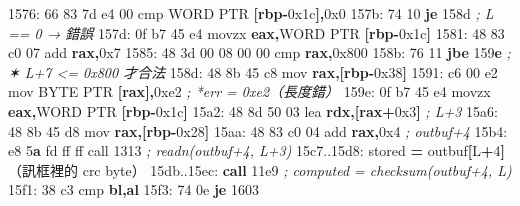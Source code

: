 \documentclass[10pt,a4paper]{article}
\newenvironment{Shaded}{\begin{snugshade}}{\end{snugshade}}
\newcommand{\BaseNTok}[1]{\textcolor[rgb]{0.00,0.00,0.81}{#1}}
\newcommand{\BuiltInTok}[1]{#1}
\newcommand{\CommentTok}[1]{\textcolor[rgb]{0.56,0.35,0.01}{\textit{#1}}}
\newcommand{\ControlFlowTok}[1]{\textcolor[rgb]{0.13,0.29,0.53}{\textbf{#1}}}
\newcommand{\DataTypeTok}[1]{\textcolor[rgb]{0.13,0.29,0.53}{#1}}
\newcommand{\DecValTok}[1]{\textcolor[rgb]{0.00,0.00,0.81}{#1}}
\newcommand{\ErrorTok}[1]{\textcolor[rgb]{0.64,0.00,0.00}{\textbf{#1}}}
\newcommand{\FloatTok}[1]{\textcolor[rgb]{0.00,0.00,0.81}{#1}}
\newcommand{\KeywordTok}[1]{\textcolor[rgb]{0.13,0.29,0.53}{\textbf{#1}}}
\newcommand{\NormalTok}[1]{#1}
\newcommand{\OperatorTok}[1]{\textcolor[rgb]{0.81,0.36,0.00}{\textbf{#1}}}
\renewenvironment{Shaded}{%
  \def\FrameCommand{\fboxsep=3.2pt\colorbox{shadecolor}}%
  \MakeFramed{\advance\hsize-\width\FrameRestore\small}%
}{%
  \endMakeFramed
}
\begin{document}
\begin{Shaded}
\begin{Highlighting}[]
\NormalTok{1576: 66 83 7d e4 }\DecValTok{00}\NormalTok{         cmp    }\DataTypeTok{WORD} \DataTypeTok{PTR} \OperatorTok{[}\KeywordTok{rbp}\OperatorTok{{-}}\BaseNTok{0x1c}\OperatorTok{],}\BaseNTok{0x0}
\NormalTok{157b: 74 10                  }\ControlFlowTok{je}     \DecValTok{158}\BaseNTok{d}                  \CommentTok{; L == 0 → 錯誤}
\NormalTok{157d: 0f b7 }\DecValTok{45}\NormalTok{ e4            movzx  }\KeywordTok{eax}\OperatorTok{,}\DataTypeTok{WORD} \DataTypeTok{PTR} \OperatorTok{[}\KeywordTok{rbp}\OperatorTok{{-}}\BaseNTok{0x1c}\OperatorTok{]}
\NormalTok{1581: 48 83 c0 }\DecValTok{07}\NormalTok{            add    }\KeywordTok{rax}\OperatorTok{,}\BaseNTok{0x7}
\NormalTok{1585: 48 3d 00 08 00 00      }\BuiltInTok{cmp}    \KeywordTok{rax}\OperatorTok{,}\BaseNTok{0x800}
\NormalTok{158b: 76 11                  }\ControlFlowTok{jbe}    \DecValTok{159}\ErrorTok{e}                  \CommentTok{; ✶ L+7 \textless{}= 0x800 才合法}
\NormalTok{158d: 48 8b 45 c8            mov    }\KeywordTok{rax}\OperatorTok{,[}\KeywordTok{rbp}\OperatorTok{{-}}\BaseNTok{0x38}\OperatorTok{]}
\NormalTok{1591: c6 }\DecValTok{00}\NormalTok{ e2               mov    }\DataTypeTok{BYTE} \DataTypeTok{PTR} \OperatorTok{[}\KeywordTok{rax}\OperatorTok{],}\BaseNTok{0xe2}   \CommentTok{; *err = 0xe2（長度錯）}
\NormalTok{159e: 0f b7 }\DecValTok{45}\NormalTok{ e4            movzx  }\KeywordTok{eax}\OperatorTok{,}\DataTypeTok{WORD} \DataTypeTok{PTR} \OperatorTok{[}\KeywordTok{rbp}\OperatorTok{{-}}\BaseNTok{0x1c}\OperatorTok{]}
\NormalTok{15a2: 48 8d 50 03            }\BuiltInTok{lea}    \KeywordTok{rdx}\OperatorTok{,[}\KeywordTok{rax}\OperatorTok{+}\BaseNTok{0x3}\OperatorTok{]}         \CommentTok{; L+3}
\NormalTok{15a6: 48 8b 45 d8            mov    }\KeywordTok{rax}\OperatorTok{,[}\KeywordTok{rbp}\OperatorTok{{-}}\BaseNTok{0x28}\OperatorTok{]}
\NormalTok{15aa: 48 83 c0 }\DecValTok{04}\NormalTok{            add    }\KeywordTok{rax}\OperatorTok{,}\BaseNTok{0x4}               \CommentTok{; outbuf+4}
\NormalTok{15b4: e8 }\DecValTok{5}\ErrorTok{a}\NormalTok{ fd ff ff         call   }\DecValTok{1313}                 \CommentTok{; readn(outbuf+4, L+3)}
\NormalTok{15c7..15d8: stored }\OperatorTok{=}\NormalTok{ outbuf}\OperatorTok{[}\NormalTok{L}\OperatorTok{+}\DecValTok{4}\OperatorTok{]}\NormalTok{（訊框裡的 crc byte）}
\NormalTok{15db..15ec: }\ControlFlowTok{call} \FloatTok{11e9}               \CommentTok{; computed = checksum(outbuf+4, L)}
\NormalTok{15f1: 38 c3                  cmp    }\KeywordTok{bl}\OperatorTok{,}\KeywordTok{al}
\NormalTok{15f3: 74 0e                  }\ControlFlowTok{je}     \DecValTok{1603}

\end{Highlighting}
\end{Shaded}
\end{document}
